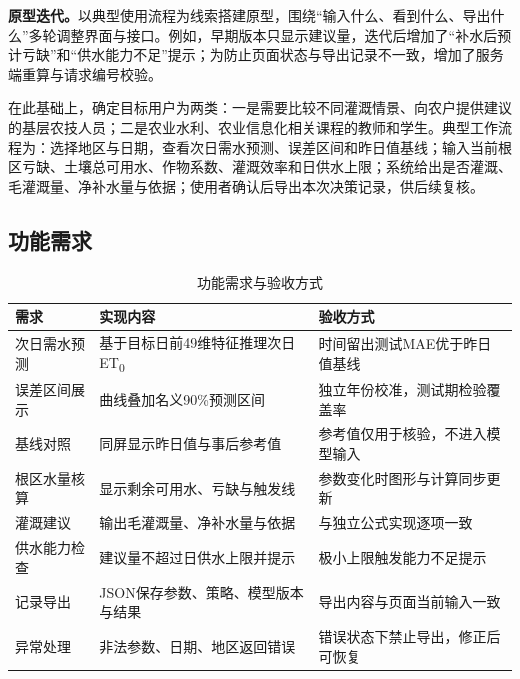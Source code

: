 \textbf{原型迭代。}以典型使用流程为线索搭建原型，围绕“输入什么、看到什么、导出什么”多轮调整界面与接口。例如，早期版本只显示建议量，迭代后增加了“补水后预计亏缺”和“供水能力不足”提示；为防止页面状态与导出记录不一致，增加了服务端重算与请求编号校验。

在此基础上，确定目标用户为两类：一是需要比较不同灌溉情景、向农户提供建议的基层农技人员；二是农业水利、农业信息化相关课程的教师和学生。典型工作流程为：选择地区与日期，查看次日需水预测、误差区间和昨日值基线；输入当前根区亏缺、土壤总可用水、作物系数、灌溉效率和日供水上限；系统给出是否灌溉、毛灌溉量、净补水量与依据；使用者确认后导出本次决策记录，供后续复核。

\subsection{功能需求}
\begin{table}[H]\centering\small
\caption{功能需求与验收方式}\label{tab:requirements}
\begin{tabularx}{\linewidth}{@{}p{.18\linewidth}XX@{}}\toprule
需求 & 实现内容 & 验收方式\\\midrule
次日需水预测 & 基于目标日前49维特征推理次日ET\textsubscript{0} & 时间留出测试MAE优于昨日值基线\\
误差区间展示 & 曲线叠加名义90\%预测区间 & 独立年份校准，测试期检验覆盖率\\
基线对照 & 同屏显示昨日值与事后参考值 & 参考值仅用于核验，不进入模型输入\\
根区水量核算 & 显示剩余可用水、亏缺与触发线 & 参数变化时图形与计算同步更新\\
灌溉建议 & 输出毛灌溉量、净补水量与依据 & 与独立公式实现逐项一致\\
供水能力检查 & 建议量不超过日供水上限并提示 & 极小上限触发能力不足提示\\
记录导出 & JSON保存参数、策略、模型版本与结果 & 导出内容与页面当前输入一致\\
异常处理 & 非法参数、日期、地区返回错误 & 错误状态下禁止导出，修正后可恢复\\\bottomrule
\end{tabularx}
\end{table}

